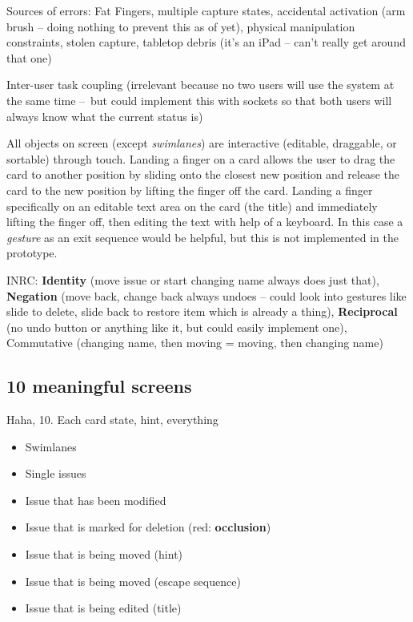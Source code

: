 Sources of errors: Fat Fingers, multiple capture states, accidental activation (arm brush – doing nothing to prevent this as of yet), physical manipulation constraints, stolen capture, tabletop debris (it's an iPad – can't really get around that one)

Inter-user task coupling (irrelevant because no two users will use the system at the same time – but could implement this with sockets so that both users will always know what the current status is)

All objects on screen (except \textit{swimlanes}) are interactive (editable, draggable, or sortable) through touch. Landing a finger on a card allows the user to drag the card to another position by sliding onto the closest new position and release the card to the new position by lifting the finger off the card. Landing a finger specifically on an editable text area on the card (the title) and immediately lifting the finger off, then editing the text with help of a keyboard. In this case a \textit{gesture} \parencite[157]{wigdow-wixon:brave-nui-world:2011} as an exit sequence would be helpful, but this is not implemented in the prototype.

INRC: \textbf{Identity} (move issue or start changing name always does just that), \textbf{Negation} (move back, change back always undoes – could look into gestures like slide to delete, slide back to restore item which is already a thing), \textbf{Reciprocal} (no undo button or anything like it, but could easily implement one), Commutative (changing name, then moving = moving, then changing name) %

\subsection{10 meaningful screens}

Haha, 10. Each card state, hint, everything


\begin{itemize}
  \item Swimlanes
  \item Single issues
  \item Issue that has been modified
  \item Issue that is marked for deletion (red: \textbf{occlusion}) 
  \item Issue that is being moved (hint)
  \item Issue that is being moved (escape sequence)
  \item Issue that is being edited (title)
\end{itemize}

